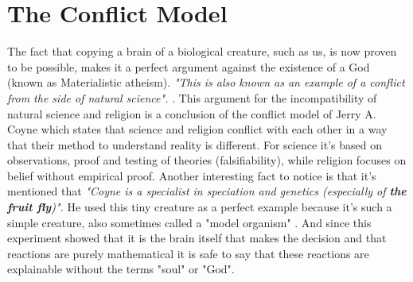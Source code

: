 \documentclass[a4paper,12pt,twoside]{report}
\begin{document}
\chapter{The Conflict Model}
The fact that copying a brain of a biological creature, such as us, is now proven to be possible, 
makes it a perfect argument against the existence of a God (known as Materialistic atheism). 
\textit{"This is also known as an example of a conflict from the side of natural science".} \cite[Chapter 3, p. 76]{depoortere2023living}.
\newline
This argument for the incompatibility of natural science and religion is a conclusion of the conflict model of Jerry A. Coyne \cite[Chapter 3, p. 97]{depoortere2023living} 
which states that science and religion conflict with each other in a way that their method to understand reality is different. 
For science it's based on observations, proof and testing of theories (falsifiability), while religion focuses on belief without empirical proof. 
Another interesting fact to notice is that it's mentioned that \textit{"Coyne is a specialist in speciation and genetics (especially of \textbf{the fruit fly})".} 
He used this tiny creature as a perfect example because it's such a simple creature, also sometimes called a "model organism" \cite{doctrow2024completewiring}. 
And since this experiment showed that it is the brain itself that makes the decision and that reactions are purely mathematical it is safe to say that these reactions are explainable without the terms "soul" or "God".
\newpage
\end{document}

